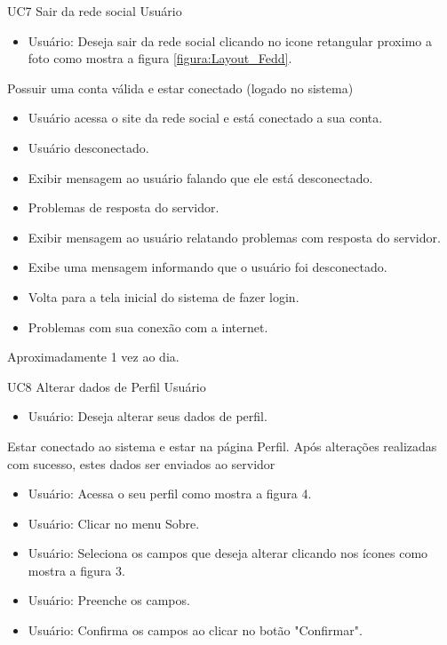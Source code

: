 \casoDeUso
{UC7}
{Sair da rede social}
{Usuário}
{
\begin{itemize}
	\item Usuário: Deseja sair da rede social clicando no icone retangular proximo a foto como mostra a figura  \ref{figura:Layout_Fedd}.
\end{itemize}

}
{Possuir uma conta válida e estar conectado (logado no sistema)}
{}
{
\begin{itemize}
	\item Usuário acessa o site da rede social e está conectado a sua conta.
	
\end{itemize}
}
{
\begin{itemize}
	\item Usuário desconectado.
	\item Exibir mensagem  ao usuário falando que ele está desconectado.
	\item Problemas de resposta do servidor.
	\item Exibir mensagem  ao usuário relatando problemas com resposta do servidor.
	\item Exibe uma mensagem informando que o usuário foi desconectado.
	\item Volta para a tela inicial do sistema de fazer login.
	\item Problemas com sua conexão com a internet.
\end{itemize}
}
{Aproximadamente 1 vez ao dia.}
{

}
\casoDeUso
{UC8}
{Alterar dados de Perfil}
{Usuário}
{
\begin{itemize}
	\item Usuário: Deseja alterar seus dados de perfil.	
\end{itemize}
}
{Estar conectado ao sistema e estar na página Perfil.}
{Após alterações realizadas com sucesso, estes dados ser enviados ao servidor}
{
\begin{itemize}
	\item Usuário: Acessa o seu perfil como mostra a figura 4.
	\item Usuário: Clicar no menu Sobre.
	\item Usuário: Seleciona os campos que deseja alterar clicando nos ícones como mostra a figura 3.
	\item Usuário: Preenche os campos.
	\item Usuário: Confirma os campos ao clicar no botão "Confirmar".
\end{itemize}
}
